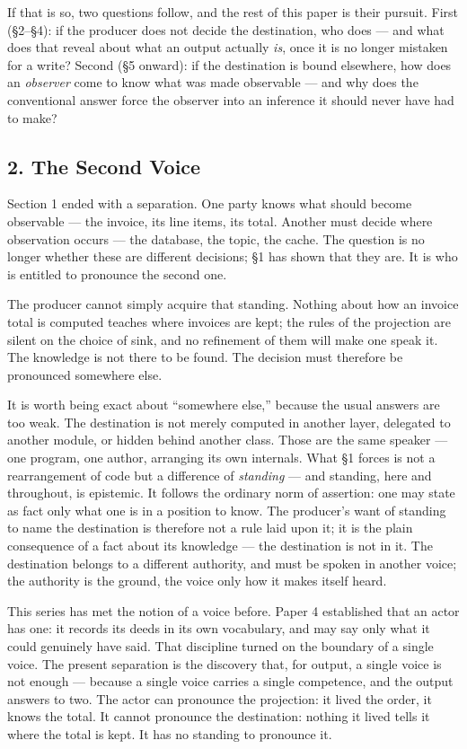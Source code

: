 \documentclass[
]{article}
\begin{document}
If that is so, two questions follow, and the rest of this paper is their
pursuit. First (§2--§4): if the producer does not decide the
destination, who does --- and what does that reveal about what an output
actually \emph{is}, once it is no longer mistaken for a write? Second
(§5 onward): if the destination is bound elsewhere, how does an
\emph{observer} come to know what was made observable --- and why does
the conventional answer force the observer into an inference it should
never have had to make?

\subsection{2. The Second Voice}\label{the-second-voice}

Section 1 ended with a separation. One party knows what should become
observable --- the invoice, its line items, its total. Another must
decide where observation occurs --- the database, the topic, the cache.
The question is no longer whether these are different decisions; §1 has
shown that they are. It is who is entitled to pronounce the second one.

The producer cannot simply acquire that standing. Nothing about how an
invoice total is computed teaches where invoices are kept; the rules of
the projection are silent on the choice of sink, and no refinement of
them will make one speak it. The knowledge is not there to be found. The
decision must therefore be pronounced somewhere else.

It is worth being exact about ``somewhere else,'' because the usual
answers are too weak. The destination is not merely computed in another
layer, delegated to another module, or hidden behind another class.
Those are the same speaker --- one program, one author, arranging its
own internals. What §1 forces is not a rearrangement of code but a
difference of \emph{standing} --- and standing, here and throughout, is
epistemic. It follows the ordinary norm of assertion: one may state as
fact only what one is in a position to know. The producer's want of
standing to name the destination is therefore not a rule laid upon it;
it is the plain consequence of a fact about its knowledge --- the
destination is not in it. The destination belongs to a different
authority, and must be spoken in another voice; the authority is the
ground, the voice only how it makes itself heard.

This series has met the notion of a voice before. Paper 4 established
that an actor has one: it records its deeds in its own vocabulary, and
may say only what it could genuinely have said. That discipline turned
on the boundary of a single voice. The present separation is the
discovery that, for output, a single voice is not enough --- because a
single voice carries a single competence, and the output answers to two.
The actor can pronounce the projection: it lived the order, it knows the
total. It cannot pronounce the destination: nothing it lived tells it
where the total is kept. It has no standing to pronounce it.
\end{document}
